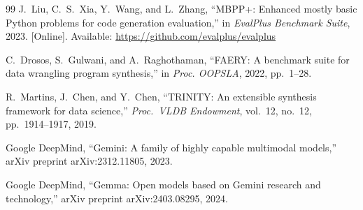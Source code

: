 \documentclass[10pt,conference]{IEEEtran}
\begin{document}
\begin{thebibliography}{99}
 J.~Liu, C.~S.~Xia, Y.~Wang, and L.~Zhang, ``MBPP+: Enhanced mostly basic Python problems for code generation evaluation,'' in \textit{EvalPlus Benchmark Suite}, 2023. [Online]. Available: \url{https://github.com/evalplus/evalplus}

 C.~Drosos, S.~Gulwani, and A.~Raghothaman, ``FAERY: A benchmark suite for data wrangling program synthesis,'' in \textit{Proc. OOPSLA}, 2022, pp.~1--28.

 R.~Martins, J.~Chen, and Y.~Chen, ``TRINITY: An extensible synthesis framework for data science,'' \textit{Proc.\ VLDB Endowment}, vol.~12, no.~12, pp.~1914--1917, 2019.

 Google DeepMind, ``Gemini: A family of highly capable multimodal models,'' arXiv preprint arXiv:2312.11805, 2023.

 Google DeepMind, ``Gemma: Open models based on Gemini research and technology,'' arXiv preprint arXiv:2403.08295, 2024.

\end{thebibliography}
\end{document}
